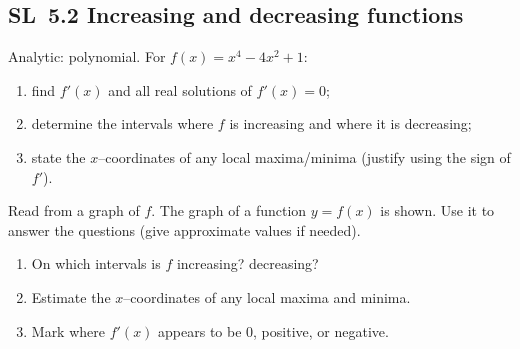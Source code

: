 \documentclass[11pt]{article}
\def\textbf#1{#1}%
\newcommand{\tocsubsection}[1]{\subsection{#1}}
\newcounter{question}
\begin{document}



\tocsubsection{SL 5.2 \; Increasing and decreasing functions}


\begin{question}
\textbf{Analytic: polynomial.}
For $f(x)=x^{4}-4x^{2}+1$:
\begin{enumerate}
  \item find $f'(x)$ and all real solutions of $f'(x)=0$;
  \item determine the intervals where $f$ is increasing and where it is decreasing;
  \item state the $x$–coordinates of any local maxima/minima (justify using the sign of $f'$).
\end{enumerate}
\end{question}

\begin{question}
\textbf{Read from a graph of $f$.}
The graph of a function $y=f(x)$ is shown. Use it to answer the questions (give approximate values if needed).
\begin{enumerate}
  \item On which intervals is $f$ increasing? decreasing?
  \item Estimate the $x$–coordinates of any local maxima and minima.
  \item Mark where $f'(x)$ appears to be $0$, positive, or negative.
\end{enumerate}

\begin{center}
\end{center}
\end{question}
\end{document}
